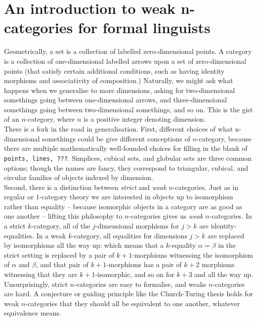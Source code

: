 \section{An introduction to weak n-categories for formal linguists}

Geometrically, a set is a collection of labelled zero-dimensional points. A category is a collection of one-dimensional labelled arrows upon a set of zero-dimensional points (that satisfy certain additional conditions, such as having identity morphisms and associativity of composition.) Naturally, we might ask what happens when we generalise to more dimensions, asking for two-dimensional somethings going between one-dimensional arrows, and three-dimensional somethings going between two-dimensional somethings, and so on. This is the gist of an $n$-category, where $n$ is a positive integer denoting dimension.\\

There is a fork in the road in generalisation. First, different choices of what n-dimensional somethings could be give different conceptions of $n$-category, because there are multiple mathematically well-founded choices for filling in the blank of \texttt{points, lines, ???}. Simplices, cubical sets, and globular sets are three common options; though the names are fancy, they correspond to triangular, cubical, and circular families of objects indexed by dimension.\\

Second, there is a distinction between \emph{strict} and \emph{weak} $n$-categories. Just as in regular or $1$-category theory we are interested in objects up to isomorphism rather than equality -- because isomorphic objects in a category are as good as one another -- lifting this philosophy to $n$-categories gives us \emph{weak} $n$-categories. In a strict $k$-category, all of the $j$-dimensional morphisms for $j > k$ are identity-equalities. In a weak $k$-category, all equalities for dimensions $j > k$ are replaced by isomorphisms all the way up: which means that a $k$-equality $\alpha = \beta$ in the strict setting is replaced by a pair of $k+1$-morphisms witnessing the isomorphism of $\alpha$ and $\beta$, and that pair of $k+1$-morphisms has a pair of $k+2$ morphisms witnessing that they are $k+1$-isomorphic, and so on for $k+3$ and all the way up. Unsurprisingly, strict $n$-categories are easy to formalise, and weaks $n$-categories are hard. A conjecture or guiding principle like the Church-Turing thesis holds for weak $n$-categories that they should all be equivalent to one another, whatever equivalence means.\\

